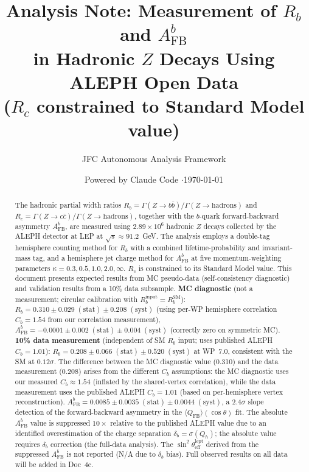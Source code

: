 \documentclass[11pt,a4paper]{article}
\title{Analysis Note: Measurement of $R_b$ and $A_\mathrm{FB}^b$\\
in Hadronic $Z$ Decays Using ALEPH Open Data\\
{\normalsize ($R_c$ constrained to Standard Model value)}}
\author{JFC Autonomous Analysis Framework}
\date{Powered by Claude Code \quad$\cdot$\quad \today}
\begin{document}
\maketitle

\begin{abstract}
The hadronic partial width ratios $R_b = \Gamma(Z \to b\bar{b})/\Gamma(Z \to \mathrm{hadrons})$
and $R_c = \Gamma(Z \to c\bar{c})/\Gamma(Z \to \mathrm{hadrons})$, together with the
$b$-quark forward-backward asymmetry $A_\mathrm{FB}^b$, are measured using $2.89 \times 10^6$
hadronic $Z$ decays collected by the ALEPH detector at LEP at $\sqrt{s} \approx 91.2$~GeV.
The analysis employs a double-tag hemisphere counting method for $R_b$ with a combined
lifetime-probability and invariant-mass tag, and a hemisphere jet charge method for
$A_\mathrm{FB}^b$ at five momentum-weighting parameters $\kappa = 0.3, 0.5, 1.0, 2.0, \infty$.
$R_c$ is constrained to its Standard Model value.
This document presents expected results from MC pseudo-data (self-consistency diagnostic)
and validation results from a 10\% data subsample.
\textbf{MC diagnostic} (not a measurement; circular calibration with $R_b^\mathrm{input} = R_b^\mathrm{SM}$):
$R_b = 0.310 \pm 0.029\;\mathrm{(stat)} \pm 0.208\;\mathrm{(syst)}$
(using per-WP hemisphere correlation $C_b = 1.54$ from our correlation measurement),
$A_\mathrm{FB}^b = -0.0001 \pm 0.002\;\mathrm{(stat)} \pm 0.004\;\mathrm{(syst)}$
(correctly zero on symmetric MC).
\textbf{10\% data measurement} (independent of SM $R_b$ input; uses published ALEPH $C_b = 1.01$):
$R_b = 0.208 \pm 0.066\;\mathrm{(stat)} \pm 0.520\;\mathrm{(syst)}$
at WP~7.0, consistent with the SM at $0.12\sigma$.
The difference between the MC diagnostic value (0.310) and the data measurement (0.208)
arises from the different $C_b$ assumptions: the MC diagnostic uses our measured
$C_b \approx 1.54$ (inflated by the shared-vertex correlation), while the data
measurement uses the published ALEPH $C_b = 1.01$ (based on per-hemisphere vertex reconstruction).
$A_\mathrm{FB}^b = 0.0085 \pm 0.0035\;\mathrm{(stat)} \pm 0.0044\;\mathrm{(syst)}$,
a $2.4\sigma$ slope detection of the forward-backward asymmetry in the
$\langle Q_\mathrm{FB} \rangle(\cos\theta)$ fit.
The absolute $A_\mathrm{FB}^b$ value is suppressed $10\times$
relative to the published ALEPH value due to an identified overestimation of the
charge separation $\delta_b = \sigma(Q_h)$; the absolute value requires $\delta_b$
correction (the full-data analysis). The $\sin^2\theta_\mathrm{eff}^\mathrm{lept}$ derived from
the suppressed $A_\mathrm{FB}^b$ is not reported (N/A due to $\delta_b$ bias).
Full observed results on all data will be added in Doc~4c.
\end{abstract}
\end{document}
